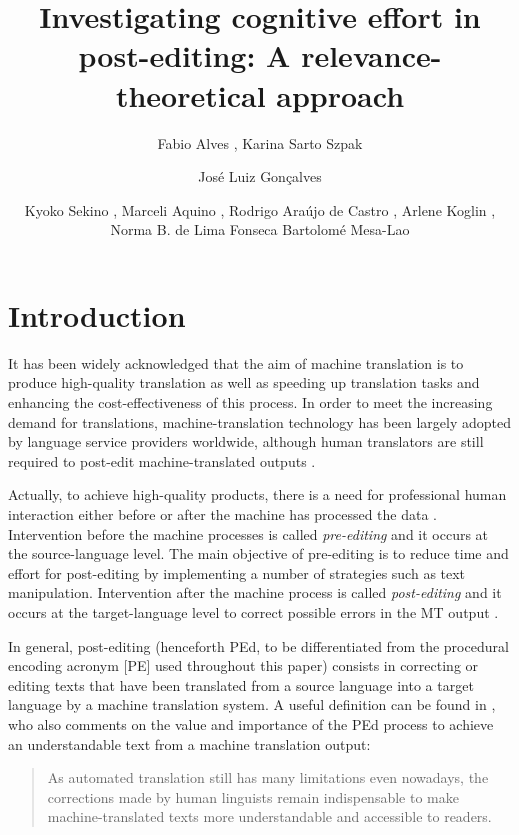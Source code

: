 \documentclass[output=paper]{langsci/langscibook}
\author{%
Fabio Alves{\ufmg}%
, 
Karina Sarto Szpak{\ufmg}%
\affiliation{UFMG}%
\and
José Luiz Gonçalves{\ufop}%
\affiliation{UFOP}%
\and
Kyoko Sekino{\ufmg}%
,
Marceli Aquino{\ufmg}%
,
Rodrigo Araújo de Castro{\ufmg}%
,
{Arlene} Koglin{\ufmg}%
,
Norma B. de Lima Fonseca{\ufmg}%
\affiliation{UFMG}%
 \lastand
Bartolomé Mesa-Lao{\cbs}
\affiliation{CBS}%
}
\title{Investigating cognitive effort in post-editing: {A} relevance-theoretical approach}
\begin{document}
\section{Introduction\label{alves:sec:Introduction}}

It has been widely acknowledged that the aim of machine translation is to produce high-quality translation as well as speeding up translation tasks and enhancing the cost-effectiveness of this process. In order to meet the increasing demand for translations, machine-translation technology has been largely adopted by language service providers worldwide, although human translators are still required to post-edit machine-translated outputs \citep[17]{almeida2013}. 


Actually, to achieve high-quality products, there is a need for professional human interaction either before or after the machine has processed the data \citep[3]{obrien2004}. Intervention before the machine processes is called \textit{pre-editing} and it occurs at the source-language level. The main objective of pre-editing is to reduce time and effort for post-editing by implementing a number of strategies such as text manipulation. Intervention after the machine process is called \textit{post-editing} and it occurs at the target-language level to correct possible errors in the MT output \citep{MesaLao2013}. 



In general, post-editing (henceforth PEd, to be differentiated from the procedural encoding acronym [PE] used throughout this paper) consists in correcting or editing texts that have been translated from a source language into a target language by a machine translation system. A useful definition can be found in \citet{Somers2001}, who also comments on the value and importance of the PEd process to achieve an understandable text from a machine translation output: 


\begin{quote}
As automated translation still has many limitations even nowadays, the corrections made by human linguists remain indispensable to make machine-translated texts more understandable and accessible to readers. \citep[138]{Somers2001}
\end{quote}
\end{document}
